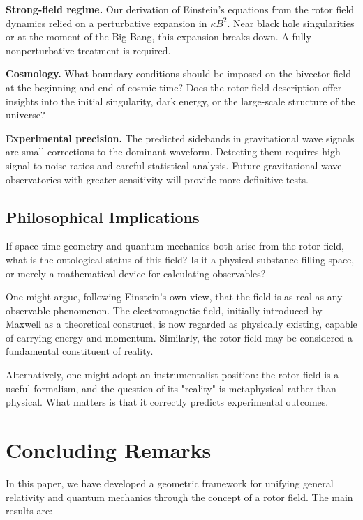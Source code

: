 \documentclass[11pt,a4paper]{article}
\numberwithin{equation}{section}
\theoremstyle{plain}
\theoremstyle{definition}
\theoremstyle{remark}
\begin{document}
\textbf{Strong-field regime.} Our derivation of Einstein's equations from the rotor field dynamics relied on a perturbative expansion in $\kappa B^2$. Near black hole singularities or at the moment of the Big Bang, this expansion breaks down. A fully nonperturbative treatment is required.

\textbf{Cosmology.} What boundary conditions should be imposed on the bivector field at the beginning and end of cosmic time? Does the rotor field description offer insights into the initial singularity, dark energy, or the large-scale structure of the universe?

\textbf{Experimental precision.} The predicted sidebands in gravitational wave signals are small corrections to the dominant waveform. Detecting them requires high signal-to-noise ratios and careful statistical analysis. Future gravitational wave observatories with greater sensitivity will provide more definitive tests.

\subsection{Philosophical Implications}

If space-time geometry and quantum mechanics both arise from the rotor field, what is the ontological status of this field? Is it a physical substance filling space, or merely a mathematical device for calculating observables?

One might argue, following Einstein's own view, that the field is as real as any observable phenomenon. The electromagnetic field, initially introduced by Maxwell as a theoretical construct, is now regarded as physically existing, capable of carrying energy and momentum. Similarly, the rotor field may be considered a fundamental constituent of reality.

Alternatively, one might adopt an instrumentalist position: the rotor field is a useful formalism, and the question of its "reality" is metaphysical rather than physical. What matters is that it correctly predicts experimental outcomes.

\section{Concluding Remarks}
\label{sec:conclusion}

In this paper, we have developed a geometric framework for unifying general relativity and quantum mechanics through the concept of a rotor field. The main results are:
\end{document}
